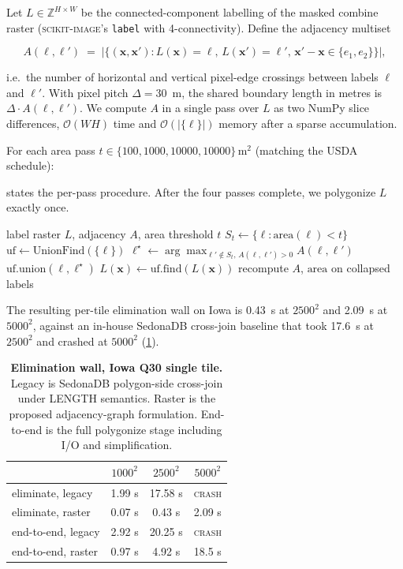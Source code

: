 \documentclass{article}
\begin{document}
Let $L \in \mathbb{Z}^{H \times W}$ be the connected-component
labelling of the masked combine raster (\textsc{scikit-image}'s
\texttt{label} with 4-connectivity). Define the adjacency multiset

\[
A(\ell, \ell') \;=\; \bigl|\{(\mathbf{x}, \mathbf{x}') :
   L(\mathbf{x})=\ell,\, L(\mathbf{x}')=\ell',\, \mathbf{x}'\!-\!\mathbf{x} \in \{e_1, e_2\}\}\bigr|,
\]

i.e.\ the number of horizontal and vertical pixel-edge crossings between
labels $\ell$ and $\ell'$. With pixel pitch $\Delta = 30$~m, the shared
boundary length in metres is $\Delta \cdot A(\ell, \ell')$. We compute
$A$ in a single pass over $L$ as two NumPy slice differences,
$\mathcal{O}(WH)$ time and $\mathcal{O}(|\{\ell\}|)$ memory after a
sparse accumulation.

For each area pass $t \in \{100, 1000, 10000, 10000\}\,\si{\meter\squared}$
(matching the USDA schedule):

 states the per-pass procedure. After the four
passes complete, we polygonize $L$ exactly once.

\begin{algorithm}[t]
\caption{Raster-side \textsc{Eliminate(LENGTH)} pass}
\label{alg:eliminate}
\begin{algorithmic}[1]
\REQUIRE label raster $L$, adjacency $A$, area threshold $t$
\STATE $S_t \gets \{\ell : \text{area}(\ell) < t\}$
\STATE $\text{uf} \gets \text{UnionFind}(\{\ell\})$
    \STATE $\ell^\star \gets \arg\max_{\ell' \notin S_t,\, A(\ell,\ell')>0} A(\ell, \ell')$
     \STATE $\text{uf.union}(\ell, \ell^\star)$ \ENDIF
\ENDFOR
\STATE $L(\mathbf{x}) \gets \text{uf.find}(L(\mathbf{x}))$ 
\STATE recompute $A$, $\text{area}$ on collapsed labels
\end{algorithmic}
\end{algorithm} The
resulting per-tile elimination wall on Iowa is 0.43~s at $2500^2$ and
2.09~s at $5000^2$, against an in-house SedonaDB cross-join baseline
that took 17.6~s at $2500^2$ and crashed at $5000^2$
(\cref{tab:eliminate}).

\begin{table}[t]
\centering
\caption{\textbf{Elimination wall, Iowa Q30 single tile.} Legacy is
SedonaDB polygon-side cross-join under \textsc{LENGTH} semantics. Raster
is the proposed adjacency-graph formulation. End-to-end is the full
polygonize stage including I/O and simplification.}
\label{tab:eliminate}
\small
\begin{tabular}{lccc}
\toprule
& $1000^2$ & $2500^2$ & $5000^2$ \\
\midrule
eliminate, legacy   & 1.99 s & 17.58 s & \textsc{crash} \\
eliminate, raster   & 0.07 s & 0.43 s  & 2.09 s \\
end-to-end, legacy  & 2.92 s & 20.25 s & \textsc{crash} \\
end-to-end, raster  & 0.97 s & 4.92 s  & 18.5 s \\
\bottomrule
\end{tabular}
\end{table}
\end{document}
